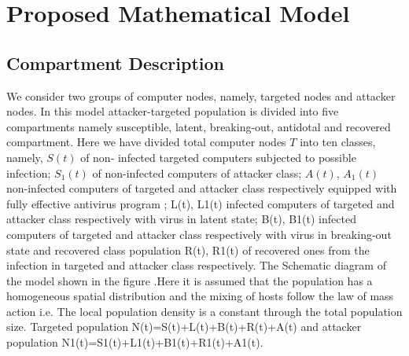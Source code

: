 
\chapter{Proposed Mathematical Model}
\section{Compartment Description}
We consider two groups of computer nodes, namely, targeted nodes and attacker nodes. In this model attacker-targeted population is divided into five compartments namely susceptible, latent, breaking-out, antidotal and recovered compartment. Here we have divided total computer nodes $T$ into ten classes, namely, $S(t)$ of non- infected targeted computers subjected to possible infection; $S_1(t)$ of non-infected computers of attacker class; $A(t)$, $A_1(t)$ non-infected computers of targeted and attacker class respectively equipped with fully effective antivirus program ; L(t), L1(t) infected computers of targeted and attacker class respectively with virus in latent state; B(t), B1(t) infected computers of targeted and attacker class respectively with virus in breaking-out state and recovered class population R(t), R1(t) of recovered ones from the infection in targeted and attacker class respectively. The Schematic diagram of the model shown in the figure .Here it is assumed that the population has a homogeneous spatial distribution and the mixing of hosts follow the law of mass action i.e. The local population density is a constant through the total population size. Targeted population N(t)=S(t)+L(t)+B(t)+R(t)+A(t)   and attacker population N1(t)=S1(t)+L1(t)+B1(t)+R1(t)+A1(t).


